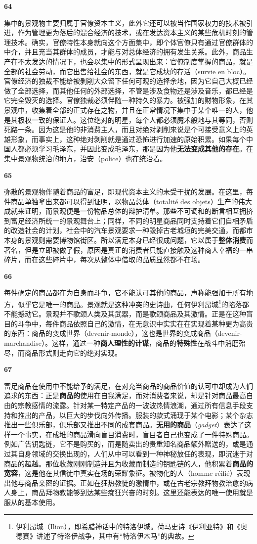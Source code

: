 \documentclass[fontset=fandol, a4paper, 12pt, openright]{ctexbook}
\makeatletter
\newcommand{\thesis}[1]{%
    \par\vspace{1.5em}%
    {\centering \textbf{\Large #1}\par}%
    \nobreak\vspace{0.5em}\nobreak
    \@afterindenttrue %
    \@afterheading    %
}
\makeatother
\begin{document}
\thesis{64}
集中的景观物主要归属于官僚资本主义，此外它还可以被当作国家权力的技术被引进，作为管理更为落后的混合经济的技术，或在发达资本主义的某些危机时刻的管理技术。确实，官僚特性本身就向这个方面集中，即个体官僚只有通过官僚群体的中介，并且充当其群体的成员，才能与对总体经济的拥有发生关系。此外，商品生产在不太发达的情况下，也会以集中的形式呈现出来：官僚制度掌握的商品，就是全部的社会劳动，而它出售给社会的东西，就是它成块的存活（survie en bloc）。官僚经济的独裁不能给被剥削大众留下任何可观的选择余地，因为它自己大概已经做了全部选择，而其他任何的外部选择，不管是涉及食物还是涉及音乐，都已经是它完全毁灭的选择。官僚独裁必须伴随一种持久的暴力。被强加的财物形象，在其景观中，收集着全部的正式存在之物，并且在正常情况下集中于某个唯一的人，他是其极权一致的保证人。这位绝对的明星，每个人都必须魔术般地与其等同，否则死路一条。因为这是他的非消费主人，而且对绝对剥削来说是个可接受意义上的英雄形象，而事实上，这种绝对剥削就是通过恐怖进行加速的原始积累。如果每个中国人都必须学习毛泽东，并因此变成毛泽东，那是因为他\textbf{无法变成其他的存在}。在集中景观物统治的地方，治安（police）也在统治着。

\thesis{65}
弥散的景观物伴随着商品的富足，即现代资本主义的未受干扰的发展。在这里，每件商品单独拿出来都可以得到证明，以物品总体（totalité des objets）生产的伟大成就来证明，而景观便是一份物品总体的辩护清单。那些不可调和的断言相互拥挤到富足经济所统一的景观舞台上；同样，不同的明星商品同时支持着它们自相矛盾的改造社会的计划，社会中的汽车景观要求一种毁掉古老城垣的完美交通，而都市本身的景观则需要博物馆街区。所以满足本身已经很成问题，它以属于\textbf{整体消费}而著名，但是立即被做了假，原因是真正的消费者只能直接触及这种商人幸福的一串碎片，而在这些碎片中，每次从整体中借取的品质显然都不在场。

\thesis{66}
每件确定的商品都在为自身而斗争，它不能认可其他的商品，声称能强加于所有地方，似乎它是唯一的商品。景观就是这种冲突的史诗曲，任何伊利昂城\footnote{伊利昂城（Ilion），即希腊神话中的特洛伊城。荷马史诗《伊利亚特》和《奥德赛》讲述了特洛伊战争，其中有“特洛伊木马”的典故。}的陷落都不能撼动它。景观并不歌颂人类及其武器，而是歌颂商品及其激情。正是在这种盲目的斗争中，每件商品依照自己的激情，在无意识中实实在在实现着某种更为高贵的东西：商品的变成世界（devenir-monde），这也是世界的变成商品（devenir-marchandise）。这样，通过一种\textbf{商人理性的计谋}，商品的\textbf{特殊性}在战斗中消磨殆尽，而商品形式则走向它的绝对实现。

\thesis{67}
富足商品在使用中不能给予的满足，在对充当商品的商品价值的认可中却成为人们追求的东西：正是\textbf{商品的}使用在自我满足，而对消费者来说，却是针对商品最高自由的宗教感情的流露。针对某一特定产品的一波波热情浪潮，通过所有信息手段支持和推出的产品，以巨大的步伐向外传播。服装的款式涌现于某个电影；某个杂志推出一些俱乐部，俱乐部又推出不同的成套商品。\textbf{无用的商品}（\textit{gadget}）表达了这样一个事实，在成堆的商品滑向盲目消费时，盲目者自己也变成了一件特殊商品。例如广告钥匙链，它不是购买的，而是随卖出的贵重知名商品额外赠送的，或是通过其自身领域的交换出现的，人们从中可以看到一种神秘放任的表现，即沉迷于对商品的超越。那位收藏刚刚制造并且为收藏而制造的钥匙链的人，他积累着\textbf{商品的宽容}，这是他在其信徒中真实在场的荣耀象征。被物化的人（homme réifié）表现出他与商品亲密的证据。正如在狂热教徒的激情中，或在古老宗教拜物教治愈的病人身上，商品拜物教能够到达某些痴狂兴奋的时刻。这里还能表达的唯一使用就是服从的基本使用。
\end{document}
